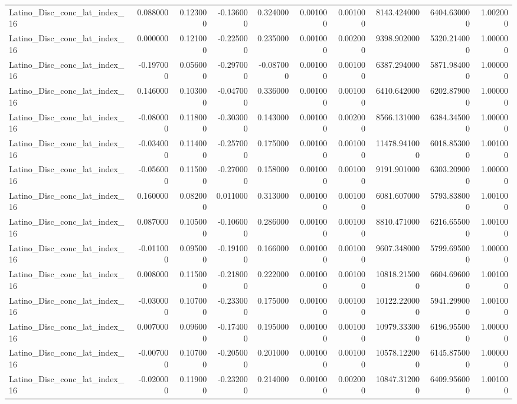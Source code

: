 \begin{table}
\begin{tabular}{lrrrrrrrrr}
Latino_Disc_conc_lat_index_16 & 0.088000 & 0.123000 & -0.136000 & 0.324000 & 0.001000 & 0.001000 & 8143.424000 & 6404.630000 & 1.002000 \\
Latino_Disc_conc_lat_index_16 & 0.000000 & 0.121000 & -0.225000 & 0.235000 & 0.001000 & 0.002000 & 9398.902000 & 5320.214000 & 1.000000 \\
Latino_Disc_conc_lat_index_16 & -0.197000 & 0.056000 & -0.297000 & -0.087000 & 0.001000 & 0.001000 & 6387.294000 & 5871.984000 & 1.000000 \\
Latino_Disc_conc_lat_index_16 & 0.146000 & 0.103000 & -0.047000 & 0.336000 & 0.001000 & 0.001000 & 6410.642000 & 6202.879000 & 1.000000 \\
Latino_Disc_conc_lat_index_16 & -0.080000 & 0.118000 & -0.303000 & 0.143000 & 0.001000 & 0.002000 & 8566.131000 & 6384.345000 & 1.000000 \\
Latino_Disc_conc_lat_index_16 & -0.034000 & 0.114000 & -0.257000 & 0.175000 & 0.001000 & 0.001000 & 11478.941000 & 6018.853000 & 1.001000 \\
Latino_Disc_conc_lat_index_16 & -0.056000 & 0.115000 & -0.270000 & 0.158000 & 0.001000 & 0.001000 & 9191.901000 & 6303.209000 & 1.000000 \\
Latino_Disc_conc_lat_index_16 & 0.160000 & 0.082000 & 0.011000 & 0.313000 & 0.001000 & 0.001000 & 6081.607000 & 5793.838000 & 1.001000 \\
Latino_Disc_conc_lat_index_16 & 0.087000 & 0.105000 & -0.106000 & 0.286000 & 0.001000 & 0.001000 & 8810.471000 & 6216.655000 & 1.001000 \\
Latino_Disc_conc_lat_index_16 & -0.011000 & 0.095000 & -0.191000 & 0.166000 & 0.001000 & 0.001000 & 9607.348000 & 5799.695000 & 1.000000 \\
Latino_Disc_conc_lat_index_16 & 0.008000 & 0.115000 & -0.218000 & 0.222000 & 0.001000 & 0.001000 & 10818.215000 & 6604.696000 & 1.001000 \\
Latino_Disc_conc_lat_index_16 & -0.030000 & 0.107000 & -0.233000 & 0.175000 & 0.001000 & 0.001000 & 10122.220000 & 5941.299000 & 1.001000 \\
Latino_Disc_conc_lat_index_16 & 0.007000 & 0.096000 & -0.174000 & 0.195000 & 0.001000 & 0.001000 & 10979.333000 & 6196.955000 & 1.000000 \\
Latino_Disc_conc_lat_index_16 & -0.007000 & 0.107000 & -0.205000 & 0.201000 & 0.001000 & 0.001000 & 10578.122000 & 6145.875000 & 1.000000 \\
Latino_Disc_conc_lat_index_16 & -0.020000 & 0.119000 & -0.232000 & 0.214000 & 0.001000 & 0.002000 & 10847.312000 & 6409.956000 & 1.001000 \\

\end{tabular}
\end{table}
